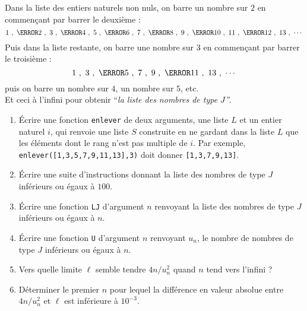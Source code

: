  
 
 
 




\begin{exercice}
Dans la liste des entiers naturels non nuls, on barre un nombre sur $2$ en commençant par barrer le deuxième :
$$ 1~,~ \cancel{2}~,~3~,~\cancel{4}~,~5~,~\cancel{6}~,~7~,~\cancel{8}~,~9~,~\cancel{10}~,~11~,~\cancel{12}~,~13~,~\cdots$$
Puis dans la liste restante, on barre une nombre sur $3$ en commençant par barrer le troisième :
$$1~,~3~,~\cancel{5}~,~7~,~9~,~\cancel{11}~,~13~,~\cdots$$
puis on barre un nombre sur $4$, un nombre sur $5$, etc.\\
Et ceci à l'infini pour obtenir ``\textit{la liste des nombres de type $J$''}.
\begin{enumerate}
\item \'Ecrire une fonction \texttt{enlever} de deux arguments, une liste $L$ et un entier naturel $i$, qui renvoie une liste $S$ construite en ne gardant dans la liste $L$ que les éléments dont le rang n'est pas multiple de $i$. Par exemple, \texttt{enlever([1,3,5,7,9,11,13],3)} doit donner \texttt{[1,3,7,9,13]}.
\item \'Ecrire une suite d'instructions donnant la liste des nombres de type $J$ inférieurs ou égaux à $100$.
\item \'Ecrire une fonction \texttt{LJ} d'argument $n$ renvoyant la liste des nombres de type $J$ inférieurs ou égaux à $n$.
\item \'Ecrire une fonction \texttt{U} d'argument $n$ renvoyant $u_n$, le nombre de nombres de type $J$ inférieurs ou égaux à $n$.
\item Vers quelle limite $\ell$ semble tendre $4n/u_n^2$ quand $n$ tend vers l'infini ?
\item Déterminer le premier $n$ pour lequel la différence en valeur absolue entre $4n/u_n^2$ et $\ell$ est inférieure à $10^{-3}$.
\end{enumerate}
\end{exercice} 
 
